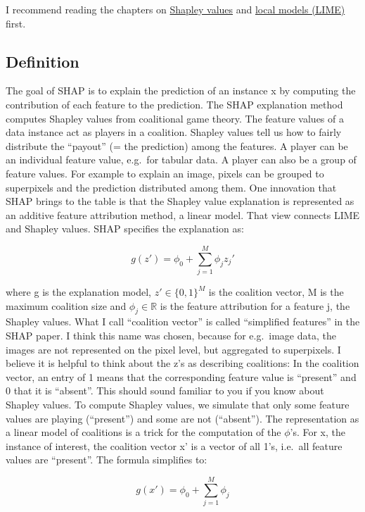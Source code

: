 \documentclass[
  10pt,
]{scrbook}
\begin{document}
I recommend reading the chapters on \protect\hyperlink{shapley}{Shapley values} and \protect\hyperlink{lime}{local models (LIME)} first.

\hypertarget{definition}{%
\subsection{Definition}\label{definition}}

The goal of SHAP is to explain the prediction of an instance x by computing the contribution of each feature to the prediction.
The SHAP explanation method computes Shapley values from coalitional game theory.
The feature values of a data instance act as players in a coalition.
Shapley values tell us how to fairly distribute the ``payout'' (= the prediction) among the features.
A player can be an individual feature value, e.g.~for tabular data.
A player can also be a group of feature values.
For example to explain an image, pixels can be grouped to superpixels and the prediction distributed among them.
One innovation that SHAP brings to the table is that the Shapley value explanation is represented as an additive feature attribution method, a linear model.
That view connects LIME and Shapley values.
SHAP specifies the explanation as:

\[g(z')=\phi_0+\sum_{j=1}^M\phi_jz_j'\]

where g is the explanation model, \(z'\in\{0,1\}^M\) is the coalition vector, M is the maximum coalition size and \(\phi_j\in\mathbb{R}\) is the feature attribution for a feature j, the Shapley values.
What I call ``coalition vector'' is called ``simplified features'' in the SHAP paper.
I think this name was chosen, because for e.g.~image data, the images are not represented on the pixel level, but aggregated to superpixels.
I believe it is helpful to think about the z's as describing coalitions:
In the coalition vector, an entry of 1 means that the corresponding feature value is ``present'' and 0 that it is ``absent''.
This should sound familiar to you if you know about Shapley values.
To compute Shapley values, we simulate that only some feature values are playing (``present'') and some are not (``absent'').
The representation as a linear model of coalitions is a trick for the computation of the \(\phi\)'s.
For x, the instance of interest, the coalition vector x' is a vector of all 1's, i.e.~all feature values are ``present''.
The formula simplifies to:

\[g(x')=\phi_0+\sum_{j=1}^M\phi_j\]
\end{document}
